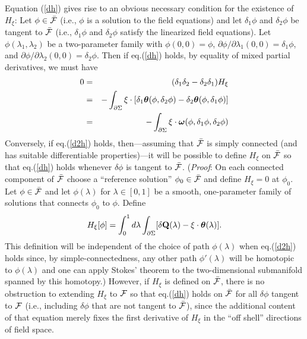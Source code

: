 Equation (\ref{dh}) gives rise to an obvious necessary condition for
the existence of $H_\xi$: Let $\phi \in \bar{\cal F}$ (i.e., $\phi$ is
a solution to the field equations) and let $\delta_1 \phi$ and
$\delta_2 \phi$ be tangent to $\bar{\cal F}$ (i.e., $\delta_1 \phi$
and $\delta_2 \phi$ satisfy the linearized field equations). Let
$\phi(\lambda_1, \lambda_2)$ be a two-parameter family with $\phi(0,0)
= \phi$, $\partial \phi/\partial \lambda_1 (0,0) = \delta_1 \phi$, and
$\partial \phi/\partial \lambda_2 (0,0) = \delta_2 \phi$. Then if
eq.(\ref{dh}) holds, by equality of mixed partial derivatives, we must
have
\begin{eqnarray}
0 & = & (\delta_1 \delta_2 - \delta_2 \delta_1) H_\xi \nonumber\\ 
& = & - \int_{\partial \Sigma} \xi \cdot [\delta_1 {\mbox{\boldmath
$\theta$}}(\phi, \delta_2 \phi) - \delta_2 {\mbox{\boldmath
$\theta$}}(\phi, \delta_1 \phi)] \nonumber\\
& = &  - \int_{\partial \Sigma} \xi \cdot {\mbox{\boldmath
$\omega$}}(\phi, \delta_1 \phi, \delta_2 \phi)
\label{d2h}
\end{eqnarray}
Conversely, if eq.(\ref{d2h}) holds, then---assuming that $\bar{\cal
F}$ is simply connected (and has suitable differentiable
properties)---it will be possible to define $H_\xi$ on $\bar{\cal F}$
so that eq.(\ref{dh}) holds whenever $\delta \phi$ is tangent to
$\bar{\cal F}$. ({\it Proof}: On each connected component of
$\bar{\cal F}$ choose a ``reference solution'' $\phi_0 \in \bar{\cal
F}$ and define $H_\xi = 0$ at $\phi_0$. Let $\phi \in \bar{\cal F}$
and let $\phi(\lambda)$ for $\lambda \in [0,1]$ be a smooth,
one-parameter family of solutions that connects $\phi_0$ to
$\phi$. Define
\begin{equation}
H_\xi [\phi] = \int_0^1 d \lambda \int_{\partial \Sigma} [\delta {\bf
Q}(\lambda) - \xi \cdot {\mbox{\boldmath $\theta$}}(\lambda)] .
\label{hdef}
\end{equation}
This definition will be independent of the choice of path
$\phi(\lambda)$ when eq.(\ref{d2h}) holds since, by
simple-connectedness, any other path $\phi'(\lambda)$ will be
homotopic to $\phi(\lambda)$ and one can apply Stokes' theorem to the
two-dimensional submanifold spanned by this homotopy.)  However, if
$H_\xi$ is defined on $\bar{\cal F}$, there is no obstruction to
extending $H_\xi$ to ${\cal F}$ so that eq.(\ref{dh}) holds on
$\bar{\cal F}$ for all $\delta \phi$ tangent to $\cal F$ (i.e.,
including $\delta \phi$ that are not tangent to $\bar{\cal F}$), since
the additional content of that equation merely fixes the first
derivative of $H_\xi$ in the ``off shell'' directions of field
space. 

